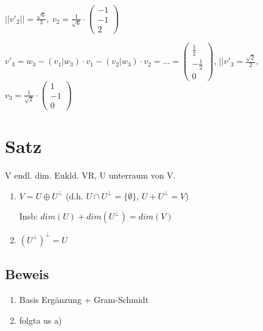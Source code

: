 \documentclass[a4paper, openany]{book}
\begin{document}
\begin{enumerate}[label=(\alph*)]
          \par \medskip

          $||v'_2|| = \frac{\sqrt{6}}{3}, \ v_2 = \frac{1}{\sqrt{6}} \cdot \begin{pmatrix}-1 \\ -1 \\ 2 \end{pmatrix}$

          \par \medskip

          $v'_3 = w_3 - (v_1|w_3) \cdot v_1 - (v_2 | w_3) \cdot v_2 = ... = \begin{pmatrix}\frac{1}{2} \\ - \frac{1}{2} \\ 0 \end{pmatrix}$, $||v'_3 = \frac{\sqrt{2}}{2}$, $v_3 = \frac{1}{\sqrt{2}} \cdot \begin{pmatrix}1 \\ -1 \\ 0 \end{pmatrix}$
        \end{enumerate}

        \section{Satz}

        V endl. dim. Eukld. VR, U unterraum von V.

        \begin{enumerate}[label=(\alph*)]
          \item $V = U \oplus U^{\perp}$ (d.h. $U \cap U^{\perp} = \{\emptyset\}$, $U + U^{\perp} = V$)

          Insb: $dim(U) + dim(U^{\perp}) = dim(V)$

          \item $(U^{\perp})^{\perp} = U$
        \end{enumerate}

        \subsection{Beweis}

        \begin{enumerate}[label=(\alph*)]
          \item Basis Ergänzung + Gram-Schmidt

          \item folgta us a)
        \end{enumerate}
\end{document}
